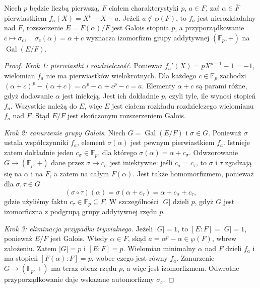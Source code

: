 \begin{twierdzenie}\label{aa:tw:as-forward}
Niech $p$ będzie liczbą pierwszą, $F$ ciałem charakterystyki $p$,
$a\in F$, zaś $\alpha\in\overline F$ pierwiastkiem
$f_a(X)=X^p-X-a$. Jeżeli $a\notin\wp(F)$, to $f_a$ jest
nierozkładalny nad $F$, rozszerzenie $E=F(\alpha)/F$ jest Galois
stopnia $p$, a przyporządkowanie
\(c\longmapsto\sigma_c,\quad \sigma_c(\alpha)=\alpha+c\)
wyznacza izomorfizm grupy addytywnej $(\mathbb F_p,+)$ na
$\operatorname{Gal}(E/F)$.
\end{twierdzenie}
\begin{proof}
\emph{Krok 1: pierwiastki i rozdzielczość.} Ponieważ
$f_a'(X)=pX^{p-1}-1=-1$, wielomian $f_a$ nie ma pierwiastków
wielokrotnych. Dla każdego $c\in\mathbb F_p$ zachodzi
\((\alpha+c)^p-(\alpha+c)=\alpha^p-\alpha+c^p-c=a\).
Elementy $\alpha+c$ są parami różne, gdyż dodawanie $\alpha$
jest iniekcją. Jest ich dokładnie $p$, czyli tyle, ile wynosi
stopień $f_a$. Wszystkie należą do $E$, więc $E$ jest ciałem
rozkładu rozdzielczego wielomianu $f_a$ nad $F$. Stąd $E/F$
jest skończonym rozszerzeniem Galois.

\emph{Krok 2: zanurzenie grupy Galois.} Niech
$G=\operatorname{Gal}(E/F)$ i $\sigma\in G$.
Ponieważ $\sigma$ ustala współczynniki $f_a$,
element $\sigma(\alpha)$ jest pewnym pierwiastkiem $f_a$.
Istnieje zatem dokładnie jeden $c_\sigma\in\mathbb F_p$,
dla którego $\sigma(\alpha)=\alpha+c_\sigma$.
Odwzorowanie $G\to(\mathbb F_p,+)$ dane przez
$\sigma\mapsto c_\sigma$ jest iniektywne: jeśli
$c_\sigma=c_\tau$, to $\sigma$ i $\tau$ zgadzają się na
$\alpha$ i na $F$, a zatem na całym $F(\alpha)$. Jest także
homomorfizmem, ponieważ dla $\sigma,\tau\in G$
\[
(\sigma\circ\tau)(\alpha)
=\sigma(\alpha+c_\tau)
=\alpha+c_\sigma+c_\tau,
\]
gdzie użyliśmy faktu $c_\tau\in\mathbb F_p\subseteq F$.
W szczególności $|G|$ dzieli $p$, gdyż $G$ jest izomorficzna
z podgrupą grupy addytywnej rzędu $p$.

\emph{Krok 3: eliminacja przypadku trywialnego.}
Jeżeli $|G|=1$, to $[E:F]=|G|=1$, ponieważ $E/F$ jest Galois.
Wtedy $\alpha\in F$, skąd $a=\alpha^p-\alpha\in\wp(F)$,
wbrew założeniu. Zatem $|G|=p$ i $[E:F]=p$.
Wielomian minimalny $\alpha$ nad $F$ dzieli $f_a$ i ma
stopień $[F(\alpha):F]=p$, wobec czego jest równy $f_a$.
Zanurzenie $G\to(\mathbb F_p,+)$ ma teraz obraz rzędu $p$,
a więc jest izomorfizmem. Odwrotne przyporządkowanie daje
wskazane automorfizmy $\sigma_c$.
\end{proof}


